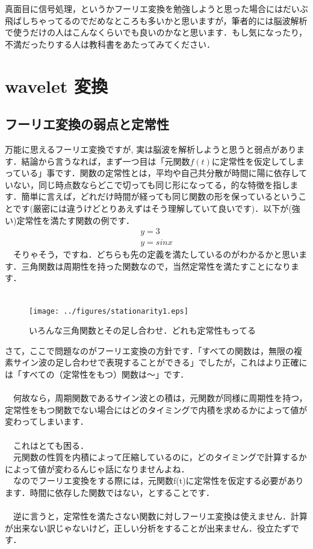 \documentclass[11pt,a4paper]{ujreport} 	%
\begin{document}
真面目に信号処理，というかフーリエ変換を勉強しようと思った場合にはだいぶ飛ばしちゃってるのでだめなところも多いかと思いますが，筆者的には脳波解析で使うだけの人はこんなくらいでも良いのかなと思います．もし気になったり，不満だったりする人は教科書をあたってみてください．
\chapter{wavelet 変換}
\section{フーリエ変換の弱点と定常性}
万能に思えるフーリエ変換ですが, 実は脳波を解析しようと思うと弱点があります．結論から言うなれば，まず一つ目は「元関数$f(t)$に定常性を仮定してしまっている」事です．関数の定常性とは，平均や自己共分散が時間に陽に依存していない，同じ時点数ならどこで切っても同じ形になってる，的な特徴を指します．簡単に言えば，どれだけ時間が経っても同じ関数の形を保っているということです(厳密には違うけどとりあえずはそう理解していて良いです)．以下が(強い)定常性を満たす関数の例です．
\begin{eqnarray}
y = 3\\
y = sinx
\end{eqnarray}
　そりゃそう，ですね．どちらも先の定義を満たしているのがわかるかと思います．三角関数は周期性を持った関数なので，当然定常性を満たすことになります．\\ \\

\begin{figure}[H]
  \label{im:stat1}
  \centering
  \texttt{[image: ../figures/stationarity1.eps]}
  \caption{いろんな三角関数とその足し合わせ．どれも定常性もってる}
\end{figure}

さて，ここで問題なのがフーリエ変換の方針です．「すべての関数は，無限の複素サイン波の足し合わせで表現することができる」でしたが，これはより正確には「すべての（定常性をもつ）関数は〜」です．\\ \\
　何故なら，周期関数であるサイン波との積は，元関数が同様に周期性を持つ，定常性をもつ関数でない場合にはどのタイミングで内積を求めるかによって値が変わってしまいます．\\
\\ 
　これはとても困る．\\
　元関数の性質を内積によって圧縮しているのに，どのタイミングで計算するかによって値が変わるんじゃ話になりませんよね．\\
　なのでフーリエ変換をする際には，元関数f(t)に定常性を仮定する必要があります．時間に依存した関数ではない，とすることです．\\
\\
　逆に言うと，定常性を満たさない関数に対しフーリエ変換は使えません．計算が出来ない訳じゃないけど，正しい分析をすることが出来ません．役立たずです．\\
\end{document}
